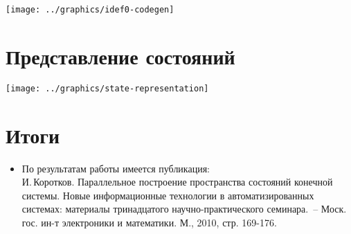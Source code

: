 \documentclass[12pt]{article}
\begin{document}
\begin{center}
  \texttt{[image: ../graphics/idef0-codegen]}
\end{center}

\section{Представление состояний}
\label{sec:state-represent}

\begin{center}
  \texttt{[image: ../graphics/state-representation]}
\end{center}

\section{Итоги}
\label{sec:publications}

\begin{itemize}
\item По результатам работы имеется публикация: \\ И.\,Коротков. Параллельное построение
  пространства состояний конечной системы. Новые информационные технологии в
  автоматизированных системах: материалы тринадцатого научно-практического семинара.~--
  Моск. гос. ин-т электроники и математики. М., 2010, стр. 169-176.

\end{itemize}
\end{document}
